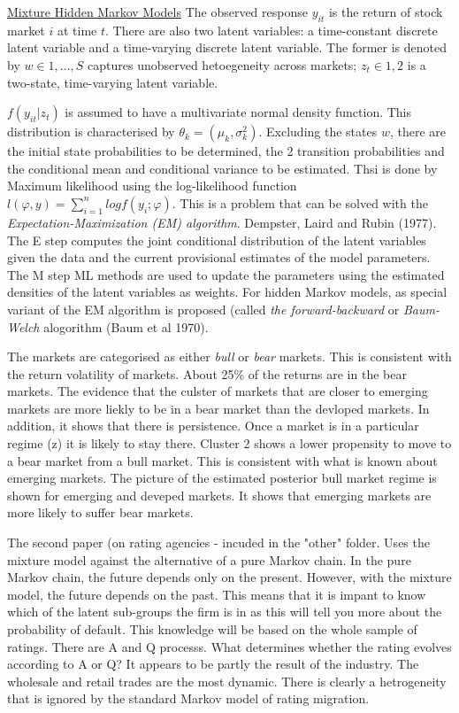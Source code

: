 \documentclass[12pt, a4paper, oneside]{article} %
\begin{document}
\href{http://members.home.nl/jeroenvermunt/dias2010.pdf}{Mixture Hidden Markov Models}  The observed response $y_{it}$ is the return of stock market $i$ at time $t$.  There are also two latent variables:  a time-constant discrete latent variable and a time-varying discrete latent variable.  The former is denoted by $w \in {1, \dots, S}$ captures unobserved hetoegeneity across markets; $z_t \in {1,2}$ is a two-state, time-varying latent variable. 

$f(y_{it}|z_t)$ is assumed to have a multivariate normal density function. This distribution is characterised by $\theta_k = (\mu_k, \sigma_k^2)$.  Excluding the states $w$, there are the initial state probabilities to be determined, the 2 transition probabilities and the conditional mean and conditional variance to be estimated.  Thsi is done by Maximum likelihood using the log-likelihood function $l(\varphi, y) = \sum_{i=1}^n log f(y_i; \varphi)$. This is a problem that can be solved with the \emph{Expectation-Maximization (EM) algorithm}.  Dempster, Laird and Rubin (1977).  The E step computes the joint conditional distribution of the latent variables given the data and the current provisional estimates of the model parameters. The M step ML methods are used to update the parameters using the estimated densities of the latent variables as weights. For hidden Markov models, as special variant of the EM algorithm is proposed (called \emph{the forward-backward} or \emph{Baum-Welch} alogorithm (Baum et al 1970).   

The markets are categorised as either \emph{bull} or \emph{bear} markets. This is consistent with the return volatility of markets.  About 25\% of the returns are in the bear markets. The evidence that the culster of markets that are closer to emerging markets are more liekly to be in a bear market than the devloped markets. In addition, it shows that there is persistence.  Once a market is in a particular regime (z) it is likely to stay there. Cluster 2 shows a lower propensity to move to a bear market from a bull market.  This is consistent with what is known about emerging markets.  The picture of the estimated posterior bull market regime is shown for emerging and deveped markets.  It shows that emerging markets are more likely to suffer bear markets.  

The second paper (on rating agencies - incuded in the "other" folder.  Uses the mixture model against the alternative of a pure Markov chain. In the pure Markov chain, the future depends only on the present.  However, with the mixture model, the future depends on the past.  This means that it is impant to know which of the latent sub-groups the firm is in as this will tell you more about the probability of default.  This knowledge will be based on the whole sample of ratings. There are A and Q processs.  What determines whether the rating evolves according to A or Q?  It appears to be partly the result of the industry.  The wholesale and retail trades are the most dynamic. There is clearly a hetrogeneity that is ignored by the standard Markov model of rating migration. 
\end{document}
